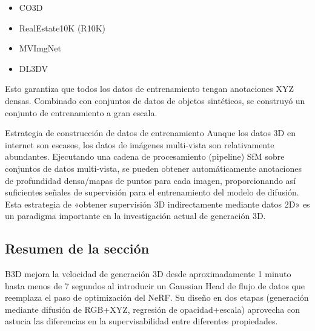 \begin{itemize}
    \item CO3D
    \item RealEstate10K (R10K)
    \item MVImgNet
    \item DL3DV
\end{itemize}

Esto garantiza que todos los datos de entrenamiento tengan anotaciones XYZ densas. Combinado con conjuntos de datos de objetos sintéticos, se construyó un conjunto de entrenamiento a gran escala.

\begin{knowledgebox}{Estrategia de construcción de datos de entrenamiento}
Aunque los datos 3D en internet son escasos, los datos de imágenes multi-vista son relativamente abundantes. Ejecutando una cadena de procesamiento (pipeline) SfM sobre conjuntos de datos multi-vista, se pueden obtener automáticamente anotaciones de profundidad densa/mapas de puntos para cada imagen, proporcionando así suficientes señales de supervisión para el entrenamiento del modelo de difusión. Esta estrategia de «obtener supervisión 3D indirectamente mediante datos 2D» es un paradigma importante en la investigación actual de generación 3D.
\end{knowledgebox}

\subsection{Resumen de la sección}

B3D mejora la velocidad de generación 3D desde aproximadamente 1 minuto hasta menos de 7 segundos al introducir un Gaussian Head de flujo de datos que reemplaza el paso de optimización del NeRF. Su diseño en dos etapas (generación mediante difusión de RGB+XYZ, regresión de opacidad+escala) aprovecha con astucia las diferencias en la supervisabilidad entre diferentes propiedades.
